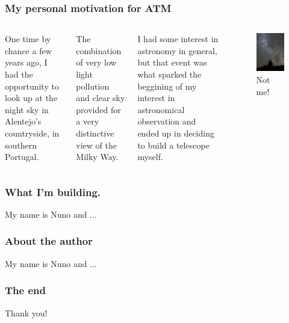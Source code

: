 \documentclass{beamer}
\begin{document}
\begin{frame}
\frametitle{My personal motivation for ATM}
\begin{columns}
One time by chance a few years ago, I had the opportunity to look up at the night sky in Alentejo's countryside, in southern Portugal.

The combination of very low light pollution and clear sky provided for a very distinctive view of the Milky Way.

I had some interest in astronomy in general, but that event was what sparked the beggining of my interest in astronomical observation and ended up in deciding to build a telescope myself.
\begin{figure}
\includegraphics[scale=0.45]{assets/800px-Starry_Night_at_La_Silla.jpg}
\caption{Not me!}
\end{figure}
\end{columns}
\end{frame}

\begin{frame}
\frametitle{What I'm building.}
My name is Nuno and ...
\end{frame}

\begin{frame}
\frametitle{About the author}
My name is Nuno and ...
\end{frame}

\begin{frame}
\frametitle{The end}
Thank you!
\end{frame}
\end{document}
